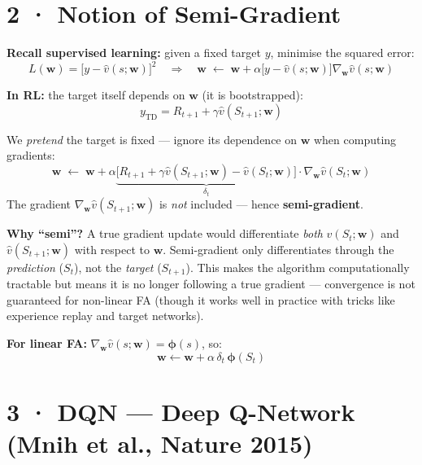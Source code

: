 \documentclass[11pt,a4paper]{article}
\begin{document}
\section*{2 · Notion of Semi-Gradient}

\textbf{Recall supervised learning:} given a fixed target $y$, minimise the squared error:
\[
  L(\mathbf{w}) = \bigl[y - \hat{v}(s;\mathbf{w})\bigr]^2
  \quad\Rightarrow\quad
  \mathbf{w} \;\leftarrow\; \mathbf{w} + \alpha\bigl[y - \hat{v}(s;\mathbf{w})\bigr]\nabla_\mathbf{w}\hat{v}(s;\mathbf{w})
\]

\textbf{In RL:} the target itself depends on $\mathbf{w}$ (it is bootstrapped):
\[
  y_{\text{TD}} = R_{t+1} + \gamma\hat{v}(S_{t+1};\mathbf{w})
\]

\begin{tcolorbox}[bold={Semi-Gradient TD Update}]
We \emph{pretend} the target is fixed — ignore its dependence on $\mathbf{w}$ when computing gradients:
\[
  \mathbf{w} \;\leftarrow\; \mathbf{w}
    + \alpha\underbrace{\bigl[R_{t+1} + \gamma\hat{v}(S_{t+1};\mathbf{w}) - \hat{v}(S_t;\mathbf{w})\bigr]}_{\delta_t}
    \cdot \nabla_\mathbf{w}\hat{v}(S_t;\mathbf{w})
\]
The gradient $\nabla_\mathbf{w}\hat{v}(S_{t+1};\mathbf{w})$ is \emph{not} included — hence \textbf{semi-gradient}.
\end{tcolorbox}

\textbf{Why ``semi''?}
A true gradient update would differentiate \emph{both} $\hat{v}(S_t;\mathbf{w})$ and $\hat{v}(S_{t+1};\mathbf{w})$
with respect to $\mathbf{w}$. Semi-gradient only differentiates through the \emph{prediction} ($S_t$),
not the \emph{target} ($S_{t+1}$). This makes the algorithm computationally tractable but means it is no
longer following a true gradient — convergence is not guaranteed for non-linear FA (though it works
well in practice with tricks like experience replay and target networks).

\textbf{For linear FA:} $\nabla_\mathbf{w}\hat{v}(s;\mathbf{w}) = \boldsymbol{\phi}(s)$, so:
\[
  \mathbf{w} \leftarrow \mathbf{w} + \alpha\,\delta_t\,\boldsymbol{\phi}(S_t)
\]

\section*{3 · DQN — Deep Q-Network (Mnih et al., Nature 2015)}
\end{document}
